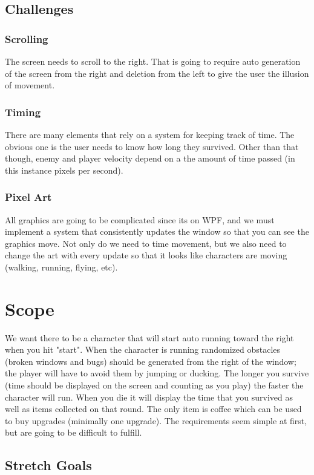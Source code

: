 \documentclass[10pt,conference,onecolumn,compsoc]{IEEEtran}
\begin{document}
\subsection{Challenges}
\subsubsection{Scrolling} The screen needs to scroll to the right. That is going to require auto generation of the screen from the right and deletion from the left to give the user the illusion of movement. 

\subsubsection{Timing}There are many elements that rely on a system for keeping track of time. The obvious one is the user needs to know how long they survived. Other than that though, enemy and player velocity depend on a the amount of time passed (in this instance pixels per second).

\subsubsection{Pixel Art}All graphics are going to be complicated since its on WPF, and we must implement a system that consistently updates the window so that you can see the graphics move. Not only do we need to time movement, but we also need to change the art with every update so that it looks like characters are moving (walking, running, flying, etc).



\section{Scope}
We want there to be a character that will start auto running toward the right when you hit "start". When the character is running randomized obstacles (broken windows and bugs) should be generated from the right of the window; the player will have to avoid them by jumping or ducking. The longer you survive (time should be displayed on the screen and counting as you play) the faster the character will run. When you die it will display the time that you survived as well as items collected on that round. The only item is coffee which can be used to buy upgrades (minimally one upgrade). The requirements seem simple at first, but are going to be difficult to fulfill.


\subsection{Stretch Goals}
\end{document}
